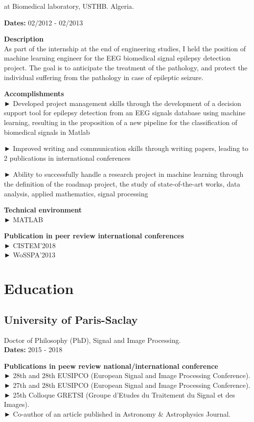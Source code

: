 \documentclass[
]{article}
\begin{document}
at Biomedical laboratory, USTHB. Algeria.

\textbf{Dates:} 02/2012 - 02/2013

\textbf{Description}\\
As part of the internship at the end of engineering studies, I held the
position of machine learning engineer for the EEG biomedical signal
epilepsy detection project. The goal is to anticipate the treatment of
the pathology, and protect the individual suffering from the pathology
in case of epileptic seizure.

\textbf{Accomplishments}\\
► Developed project management skills through the development of a
decision support tool for epilepsy detection from an EEG signals
database using machine learning, resulting in the proposition of a new
pipeline for the classification of biomedical signals in Matlab

► Improved writing and communication skills through writing papers,
leading to 2 publications in international conferences

► Ability to successfully handle a research project in machine learning
through the definition of the roadmap project, the study of
state-of-the-art works, data analysis, applied mathematics, signal
processing

\textbf{Technical environment}\\
► MATLAB

\textbf{Publication in peer review international conferences}\\
► CISTEM'2018\\
► WoSSPA'2013

\hypertarget{education}{%
\section{Education}\label{education}}

\hypertarget{university-of-paris-saclay}{%
\subsection{University of
Paris-Saclay}\label{university-of-paris-saclay}}

Doctor of Philosophy (PhD), Signal and Image Processing.\\
\textbf{Dates:} 2015 - 2018

\textbf{Publications in peew review national/international conference}\\
► 28th and 28th EUSIPCO (European Signal and Image Processing
Conference).\\
► 27th and 28th EUSIPCO (European Signal and Image Processing
Conference).\\
► 25th Colloque GRETSI (Groupe d'Etudes du Traitement du Signal et des
Images).\\
► Co-author of an article published in Astronomy \& Astrophysics
Journal.
\end{document}
